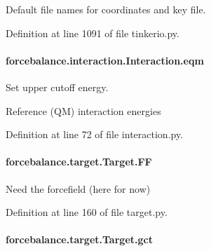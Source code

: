 Default file names for coordinates and key file. 



Definition at line 1091 of file tinkerio.\-py.

\hypertarget{classforcebalance_1_1interaction_1_1Interaction_a4e609a6bd7e9a0852622ecc4ca5537d1}{
\paragraph[{eqm}]{\setlength{\rightskip}{0pt plus 5cm}forcebalance.\-interaction.\-Interaction.\-eqm\hspace{0.3cm}{\ttfamily [inherited]}}}\label{classforcebalance_1_1interaction_1_1Interaction_a4e609a6bd7e9a0852622ecc4ca5537d1}


Set upper cutoff energy. 

Reference (Q\-M) interaction energies 

Definition at line 72 of file interaction.\-py.

\hypertarget{classforcebalance_1_1target_1_1Target_a38a37919783141ea37fdcf8b00ce0aaf}{
\paragraph[{F\-F}]{\setlength{\rightskip}{0pt plus 5cm}forcebalance.\-target.\-Target.\-F\-F\hspace{0.3cm}{\ttfamily [inherited]}}}\label{classforcebalance_1_1target_1_1Target_a38a37919783141ea37fdcf8b00ce0aaf}


Need the forcefield (here for now) 



Definition at line 160 of file target.\-py.

\hypertarget{classforcebalance_1_1target_1_1Target_aa625ac88c6744eb14ef281d9496d0dbb}{
\paragraph[{gct}]{\setlength{\rightskip}{0pt plus 5cm}forcebalance.\-target.\-Target.\-gct\hspace{0.3cm}{\ttfamily [inherited]}}}\label{classforcebalance_1_1target_1_1Target_aa625ac88c6744eb14ef281d9496d0dbb}


